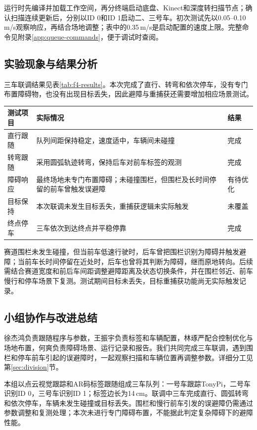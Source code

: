 运行时先编译并加载工作空间，再分终端启动底盘、Kinect和深度转扫描节点；确认扫描连续更新后，分别以ID 0和ID 1启动二、三号车。初次测试先以0.05--0.10\,m/s观察响应，再结合场地调整；表中的0.35\,m/s是启动配置的速度上限。完整命令见附录\ref{app:queue-commands}，便于调试时查阅。

\subsection{实验现象与结果分析}
三车联调结果见表\ref{tab:f4-results}。本次完成了直行、转弯和依次停车，没有专门布置障碍物，也没有出现目标丢失，因此避障与重捕获还需要增加相应场景测试。

\noindent\begin{minipage}{\linewidth}\centering\small
{}\label{tab:f4-results}
\vspace{-3pt}\renewcommand{\arraystretch}{1.05}\setlength{\tabcolsep}{4pt}
\begin{tabularx}{\linewidth}{p{39mm}Yp{22mm}}\toprule
测试项目 & 实际情况 & 结果\\\midrule
直行跟随 & 队列间距保持稳定，速度适中，车辆间未碰撞 & 完成\\
转弯跟随 & 采用圆弧轨迹转弯，保持后车对前车标签的观测 & 完成\\
障碍响应 & 最终场地未专门布置障碍；未碰撞围栏，但围栏及长时间停留的前车曾触发误避障 & 有待优化\\
目标保持 & 本次联调未发生目标丢失，重捕获逻辑未实际触发 & 未覆盖\\
终点停车 & 三车依次到达终点并平稳停靠 & 完成\\
\bottomrule\end{tabularx}
\end{minipage}

赛道围栏未发生碰撞，但当前车低速行驶时，后车曾把围栏识别为障碍并触发避障；当前车长时间停留在近处时，后车也曾将其判断为障碍，继而原地转向。后续需结合赛道宽度和前后车间距调整避障距离及状态切换条件，并在围栏邻近、前车慢行和停车场景下复测。测试期间目标未丢失，目标重捕获功能尚无实际触发记录。

\subsection{小组协作与改进总结}
徐杰鸿负责跟随程序与参数，王振宇负责标签和车辆配置，林琢严配合控制优化与场地布置，何爽负责障碍场景、运行记录和报告。我们共同完成三车联调，遇到围栏和停车前车引起的误避障时，一起观察扫描和车辆位置再调整参数。详细分工见第\ref{sec:division}节。




本组以点云视觉跟踪和AR码标签跟随组成三车队列：一号车跟踪TonyPi，二号车识别ID 0，三号车识别ID 1；标签边长为14\,cm。联调中三车完成直行、圆弧转弯和依次停车，车辆未发生碰撞或目标丢失。围栏和慢行前车引发的误避障仍需通过参数调整和复测处理；本次未进行专门障碍布置，不能据此判定复杂障碍下的避障性能。
